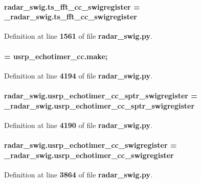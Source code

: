\paragraph[{ts\+\_\+fft\+\_\+cc\+\_\+swigregister}]{\setlength{\rightskip}{0pt plus 5cm}radar\+\_\+swig.\+ts\+\_\+fft\+\_\+cc\+\_\+swigregister = \+\_\+radar\+\_\+swig.\+ts\+\_\+fft\+\_\+cc\+\_\+swigregister}\label{namespaceradar__swig_a86e02d3b1fb2fb7e34ec5e54b29cbe20}


Definition at line {\bf 1561} of file {\bf radar\+\_\+swig.\+py}.

\paragraph[{usrp\+\_\+echotimer\+\_\+cc}]{ = {\bf usrp\+\_\+echotimer\+\_\+cc.\+make};}\label{namespaceradar__swig_ac597fd133c1b5b947aaefd2cd4cbfe60}


Definition at line {\bf 4194} of file {\bf radar\+\_\+swig.\+py}.

\paragraph[{usrp\+\_\+echotimer\+\_\+cc\+\_\+sptr\+\_\+swigregister}]{\setlength{\rightskip}{0pt plus 5cm}radar\+\_\+swig.\+usrp\+\_\+echotimer\+\_\+cc\+\_\+sptr\+\_\+swigregister = \+\_\+radar\+\_\+swig.\+usrp\+\_\+echotimer\+\_\+cc\+\_\+sptr\+\_\+swigregister}\label{namespaceradar__swig_ac9d9bf9cab2bfd21547ac5f149b49f82}


Definition at line {\bf 4190} of file {\bf radar\+\_\+swig.\+py}.

\paragraph[{usrp\+\_\+echotimer\+\_\+cc\+\_\+swigregister}]{\setlength{\rightskip}{0pt plus 5cm}radar\+\_\+swig.\+usrp\+\_\+echotimer\+\_\+cc\+\_\+swigregister = \+\_\+radar\+\_\+swig.\+usrp\+\_\+echotimer\+\_\+cc\+\_\+swigregister}\label{namespaceradar__swig_a7650e9e60d21e95552d5ca92675d0b82}


Definition at line {\bf 3864} of file {\bf radar\+\_\+swig.\+py}.

